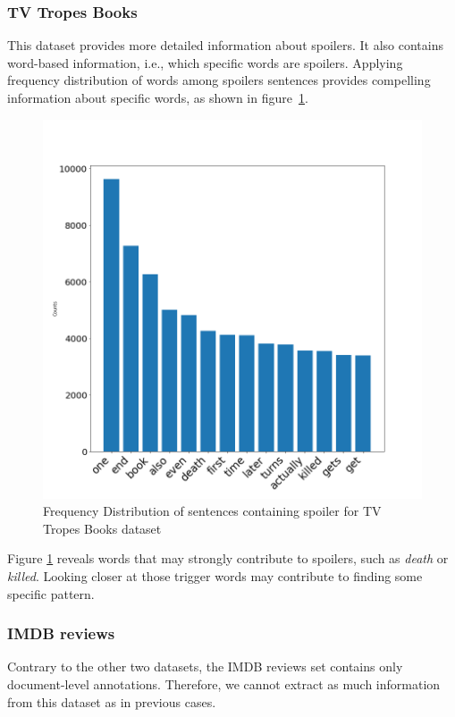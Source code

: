 \documentclass[11pt]{article}
\begin{document}
\subsubsection*{TV Tropes Books}

This dataset provides more detailed information about spoilers. It also contains word-based information, i.e., which specific words are spoilers. Applying frequency distribution of words among spoilers sentences provides compelling information about specific words, as shown in figure~\ref{fig:freq-dist-troop}.

\begin{figure}
    \centering
    \includegraphics[width=\columnwidth]{img/FreqDistFiqure_Troops.png}
    \caption{Frequency Distribution of sentences containing spoiler for TV Tropes Books dataset} 
    \label{fig:freq-dist-troop}
\end{figure}

Figure \ref{fig:freq-dist-troop} reveals words that may strongly contribute to spoilers, such as \emph{death} or \emph{killed}. Looking closer at those trigger words may contribute to finding some specific pattern. 

\subsubsection*{IMDB reviews}
Contrary to the other two datasets, the IMDB reviews set contains only document-level annotations. Therefore, we cannot extract as much information from this dataset as in previous cases.
\end{document}
